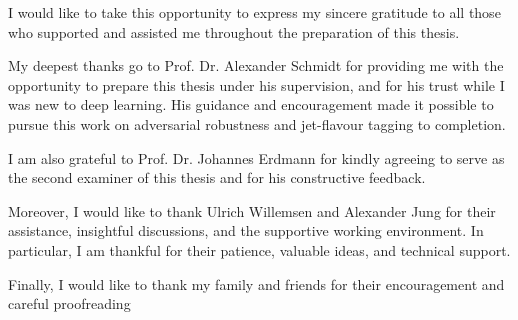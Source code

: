 \documentclass[12pt]{caltech_thesis}
\begin{document}
\begin{acknowledgements}

I would like to take this opportunity to express my sincere gratitude to all those who supported and assisted me throughout the preparation of this thesis.

My deepest thanks go to Prof. Dr. Alexander Schmidt for providing me with the opportunity to prepare this thesis under his supervision, and for his trust while I was new to deep learning. His guidance and encouragement made it possible to pursue this work on adversarial robustness and jet-flavour tagging to completion.

I am also grateful to Prof. Dr. Johannes Erdmann for kindly agreeing to serve as the second examiner of this thesis and for his constructive feedback.

Moreover, I would like to thank Ulrich Willemsen and Alexander Jung for their assistance, insightful discussions, and the supportive working environment. In particular, I am thankful for their patience, valuable ideas, and technical support.

Finally, I would like to thank my family and friends for their encouragement and careful proofreading

\end{acknowledgements}

\tableofcontents
\listoffigures
\listoftables
\glsaddall[types=\acronymtype]
\clearpage
{%
  \let\cleardoublepage\clearpage
  \printglossary[type=\acronymtype,nonumberlist,style=long]%
}

\mainmatter













\printbibliography

\appendix

\let\oldaddcontentsline\addcontentsline
\renewcommand{\addcontentsline}[3]{%
  \ifnum\pdfstrcmp{#2}{figure}=0
    \ifnum\value{chapter}>0
    \else
      \oldaddcontentsline{#1}{#2}{#3}%
    \fi
  \else
    \oldaddcontentsline{#1}{#2}{#3}%
  \fi
}
\end{document}
